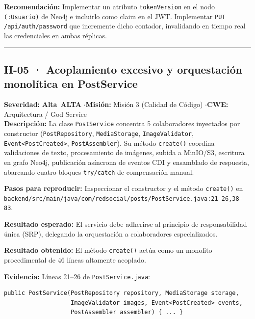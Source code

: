 \documentclass[10pt,a4paper]{article}
\newcommand{\code}[1]{\nolinkurl{#1}}
\newcommand{\badgeAlta}{\colorbox{orange!20}{\textcolor{orange!90!black}{\textbf{\footnotesize Alta}}}}
\begin{document}
\noindent\textbf{Recomendación:}
Implementar un atributo \code{tokenVersion} en el nodo \code{(:Usuario)} de Neo4j e incluirlo como claim en el JWT. Implementar \code{PUT /api/auth/password} que incremente dicho contador, invalidando en tiempo real las credenciales en ambas réplicas.

\vspace{0.8em}
\hrule
\vspace{0.8em}

\subsection{H-05 · Acoplamiento excesivo y orquestación monolítica en PostService}
\noindent\textbf{Severidad:} \badgeAlta\ \textbf{ALTA} \quad$\cdot$\quad \textbf{Misión:} Misión 3 (Calidad de Código) \quad$\cdot$\quad \textbf{CWE:} Arquitectura / God Service\\[0.3em]

\noindent\textbf{Descripción:}
La clase \code{PostService} concentra 5 colaboradores inyectados por constructor (\code{PostRepository}, \code{MediaStorage}, \code{ImageValidator}, \code{Event<PostCreated>}, \code{PostAssembler}). Su método \code{create()} coordina validaciones de texto, procesamiento de imágenes, subida a MinIO/S3, escritura en grafo Neo4j, publicación asíncrona de eventos CDI y ensamblado de respuesta, abarcando cuatro bloques \code{try/catch} de compensación manual.

\noindent\textbf{Pasos para reproducir:}
Inspeccionar el constructor y el método \code{create()} en \code{backend/src/main/java/com/redsocial/posts/PostService.java:21-26,38-83}.

\noindent\textbf{Resultado esperado:}
El servicio debe adherirse al principio de responsabilidad única (SRP), delegando la orquestación a colaboradores especializados.

\noindent\textbf{Resultado obtenido:}
El método \code{create()} actúa como un monolito procedimental de 46 líneas altamente acoplado.

\noindent\textbf{Evidencia:}
Líneas 21--26 de \code{PostService.java}:
\begin{tcolorbox}[colback=codebg,colframe=gray!40,arc=1mm]\small
\begin{verbatim}
public PostService(PostRepository repository, MediaStorage storage,
                   ImageValidator images, Event<PostCreated> events,
                   PostAssembler assembler) { ... }
\end{verbatim}
\end{tcolorbox}
\end{document}
